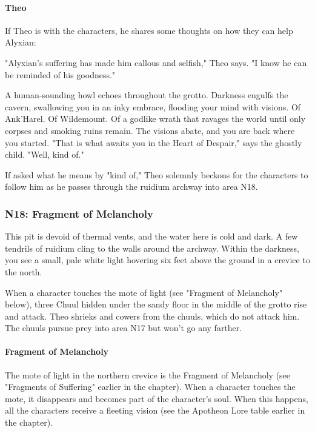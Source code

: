 \documentclass[10pt,a4paper,twoside,twocolumn,openany,nodeprecatedcode]{dndbook}
\begin{document}
\paragraph{Theo}
If Theo is with the characters, he shares some thoughts on how they can help Alyxian:

\begin{DndReadAloud}{}
"Alyxian's suffering has made him callous and selfish," Theo says. "I know he can be reminded of his goodness."

A human-sounding howl echoes throughout the grotto. Darkness engulfs the cavern, swallowing you in an inky embrace, flooding your mind with visions. Of Ank'Harel. Of Wildemount. Of a godlike wrath that ravages the world until only corpses and smoking ruins remain. The visions abate, and you are back where you started. "That is what awaits you in the Heart of Despair," says the ghostly child. "Well, kind of."

\end{DndReadAloud}

If asked what he means by "kind of," Theo solemnly beckons for the characters to follow him as he passes through the ruidium archway into area N18.



\subsubsection{N18: Fragment of Melancholy}
\begin{DndReadAloud}{}
This pit is devoid of thermal vents, and the water here is cold and dark. A few tendrils of ruidium cling to the walls around the archway. Within the darkness, you see a small, pale white light hovering six feet above the ground in a crevice to the north.

\end{DndReadAloud}

When a character touches the mote of light (see "Fragment of Melancholy" below), three Chuul hidden under the sandy floor in the middle of the grotto rise and attack. Theo shrieks and cowers from the chuuls, which do not attack him. The chuuls pursue prey into area N17 but won't go any farther.

\paragraph{Fragment of Melancholy}
The mote of light in the northern crevice is the Fragment of Melancholy (see "Fragments of Suffering" earlier in the chapter). When a character touches the mote, it disappears and becomes part of the character's soul. When this happens, all the characters receive a fleeting vision (see the Apotheon Lore table earlier in the chapter).
\end{document}

